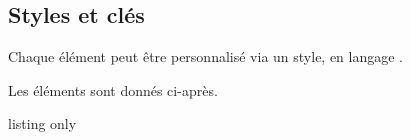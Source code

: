 \begin{PresCodePL}{}
\end{PresCodePL}

\begin{PresCodePL}{}
\end{PresCodePL}

\subsection{Styles et clés}

\begin{tipblock}
Chaque élément peut être personnalisé via un style, en langage .

Les éléments sont donnés ci-après.
\end{tipblock}

\begin{PresCodeTexPL}{listing only}
\end{PresCodeTexPL}


